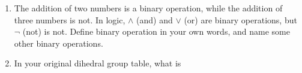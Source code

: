 \documentclass[../textbook.tex]{subfiles}
\begin{document}
\begin{enumerate}
\setcounter{enumi}{\theenumLast}
\item The addition of two numbers is a binary operation, while the addition of three numbers is not. In logic, $\land$ (and) and $\lor$ (or) are binary operations, but $\lnot$ (not) is not. Define binary operation in your own words, and name some other binary operations.
\item In your original dihedral group table, what is
\begin{enumerate}
\end{enumerate}
\end{enumerate}
\end{document}
